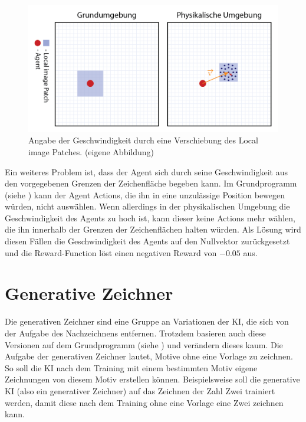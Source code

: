 \begin{figure}[!ht]
 \centering
 \includegraphics[width=\textwidth]{images/methode/patch-move.png}
 \caption{Angabe der Geschwindigkeit durch eine Verschiebung des Local image Patches. (eigene Abbildung)}\label{fig:patch-move}
\end{figure}
 
Ein weiteres Problem ist, dass der Agent sich durch seine Geschwindigkeit aus
den vorgegebenen Grenzen der Zeichenfläche begeben kann. Im Grundprogramm 
(siehe ) kann der Agent Actions, die ihn in eine
unzulässige Position bewegen würden, nicht auswählen. Wenn allerdings in der
physikalischen Umgebung die Geschwindigkeit des Agents zu hoch ist, kann dieser
keine Actions mehr wählen, die ihn innerhalb der Grenzen der Zeichenflächen
halten würden. Als Lösung wird diesen Fällen die Geschwindigkeit des Agents auf den
Nullvektor zurückgesetzt und die Reward-Function löst einen negativen Reward von
$-0.05$ aus.

\section{Generative Zeichner}\label{chap:m_gen} Die generativen Zeichner sind
eine Gruppe an Variationen der KI, die sich von der Aufgabe des Nachzeichnens
entfernen. Trotzdem basieren auch diese Versionen auf dem Grundprogramm (siehe
) und verändern dieses kaum. Die Aufgabe der generativen
Zeichner lautet, Motive ohne eine Vorlage zu zeichnen. So soll die KI nach dem
Training mit einem bestimmten Motiv eigene Zeichnungen von diesem Motiv
erstellen können. Beispielsweise soll die generative KI (also ein generativer
Zeichner) auf das Zeichnen der Zahl Zwei trainiert werden, damit diese nach dem
Training ohne eine Vorlage eine Zwei zeichnen kann.

